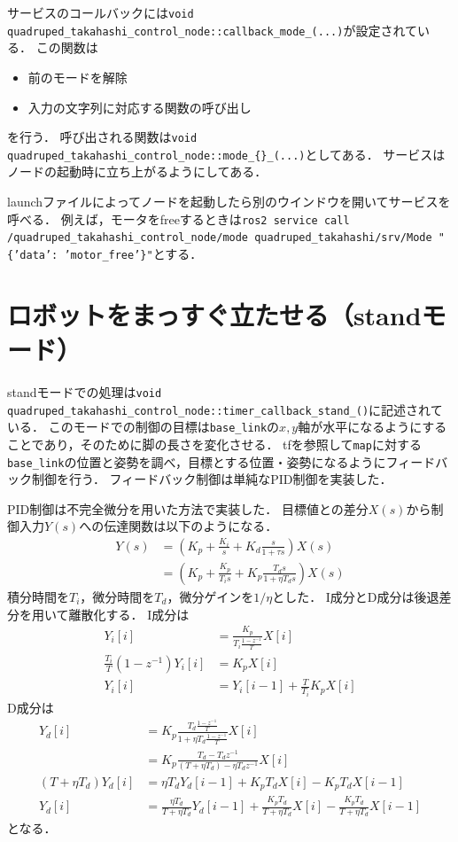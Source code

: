 \documentclass[a4paper]{jlreq}
\begin{document}
サービスのコールバックには\texttt{void quadruped\_takahashi\_control\_node::callback\_mode\_(...)}が設定されている．
この関数は
\begin{itemize}
  \item 前のモードを解除
  \item 入力の文字列に対応する関数の呼び出し
\end{itemize}
を行う．
呼び出される関数は\texttt{void quadruped\_takahashi\_control\_node::mode\_\{\}\_(...)}としてある．
サービスはノードの起動時に立ち上がるようにしてある．

launchファイルによってノードを起動したら別のウインドウを開いてサービスを呼べる．
例えば，モータをfreeするときは\texttt{ros2 service call /quadruped\_takahashi\_control\_node/mode quadruped\_takahashi/srv/Mode "\{'data': 'motor\_free'\}"}とする．

\section{ロボットをまっすぐ立たせる（standモード）}

standモードでの処理は\texttt{void quadruped\_takahashi\_control\_node::timer\_callback\_stand\_()}に記述されている．
このモードでの制御の目標は\texttt{base\_link}の$x, y$軸が水平になるようにすることであり，そのために脚の長さを変化させる．
tfを参照して\texttt{map}に対する\texttt{base\_link}の位置と姿勢を調べ，目標とする位置・姿勢になるようにフィードバック制御を行う．
フィードバック制御は単純なPID制御を実装した．

PID制御は不完全微分を用いた方法で実装した．
目標値との差分$X(s)$から制御入力$Y(s)$への伝達関数は以下のようになる．
\begin{align*}
  Y(s) &= \left(K_p + \frac{K_i}{s} + K_d\frac{s}{1+\tau s}\right)X(s) \\
  &= \left(K_p + \frac{K_p}{T_i s} + K_p\frac{T_d s}{1+\eta T_d s}\right)X(s)
\end{align*}
積分時間を$T_i$，微分時間を$T_d$，微分ゲインを$1/\eta$とした．
I成分とD成分は後退差分を用いて離散化する．
I成分は
\begin{align*}
  Y_i[i] &= \frac{K_p}{T_i \frac{1-z^{-1}}{T}} X[i] \\
  \frac{T_i}{T} \left(1-z^{-1}\right) Y_i[i] &= K_p X[i] \\
  Y_i[i] &= Y_i[i-1] + \frac{T}{T_i}K_p X[i]
\end{align*}
D成分は
\begin{align*}
  Y_d[i] &= K_p \frac{T_d \frac{1-z^{-1}}{T}}{1 + \eta T_d \frac{1-z^{-1}}{T}}X[i] \\
  &= K_p \frac{T_d - T_d z^{-1}}{\left(T + \eta T_d\right) - \eta T_d z^{-1}}X[i] \\
  \left(T + \eta T_d\right) Y_d[i] &= \eta T_d Y_d[i-1] + K_p T_d X[i] - K_p T_d X[i-1] \\
  Y_d[i] &= \frac{\eta T_d}{T + \eta T_d} Y_d[i-1] + \frac{K_p T_d}{T + \eta T_d} X[i] - \frac{K_p T_d}{T + \eta T_d} X[i-1]
\end{align*}
となる．
\end{document}

